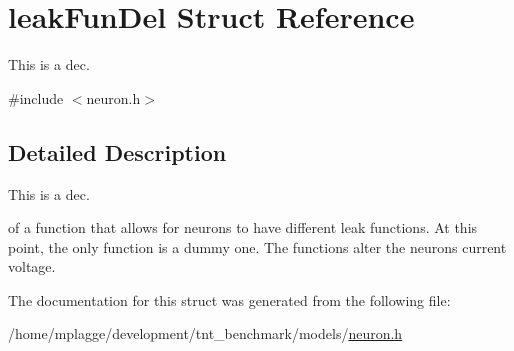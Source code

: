\hypertarget{structleak_fun_del}{}\section{leak\+Fun\+Del Struct Reference}
\label{structleak_fun_del}


This is a dec.  




{\ttfamily \#include $<$neuron.\+h$>$}



\subsection{Detailed Description}
This is a dec. 

of a function that allows for neurons to have different leak functions. At this point, the only function is a dummy one. The functions alter the neuron\textquotesingle{}s current voltage. 

The documentation for this struct was generated from the following file\+:\begin{DoxyCompactItemize}
\item 
/home/mplagge/development/tnt\+\_\+benchmark/models/\hyperlink{neuron_8h}{neuron.\+h}\end{DoxyCompactItemize}
